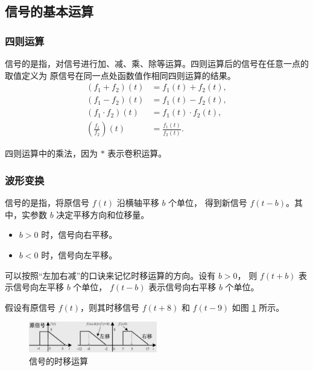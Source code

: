 \subsection{信号的基本运算}

\subsubsection{四则运算}

\begin{definition}
    信号的是指，对信号进行加、减、乘、除等运算。四则运算后的信号在任意一点的取值定义为
    原信号在同一点处函数值作相同四则运算的结果。
    \begin{align*}
        (f_1 + f_2)(t) & = f_1(t) + f_2(t), \\
        (f_1 - f_2)(t) & = f_1(t) - f_2(t), \\
        (f_1 \cdot f_2)(t) & = f_1(t) \cdot f_2(t), \\
        \left(\frac{f_1}{f_2}\right)(t) & = \frac{f_1(t)}{f_2(t)}.
    \end{align*}
\end{definition}

\begin{note}
    四则运算中的乘法，因为 $*$ 表示卷积运算。
\end{note}

\subsubsection{波形变换}

\begin{definition}[时移运算]
    信号的是指，将原信号 $f(t)$ 沿横轴平移 $b$ 个单位，
    得到新信号 $f(t - b)$。其中，实参数 $b$ 决定平移方向和位移量。
    \begin{itemize}
        \item $b > 0$ 时，信号向右平移。
        \item $b < 0$ 时，信号向左平移。
    \end{itemize}
\end{definition}

\begin{note}
    可以按照``左加右减''的口诀来记忆时移运算的方向。设有 $b > 0$，
    则 $f(t + b)$ 表示信号向左平移 $b$ 个单位，
    $f(t - b)$ 表示信号向右平移 $b$ 个单位。
\end{note}

\begin{example}
    假设有原信号 $f(t)$，则其时移信号 $f(t + 8)$ 和 $f(t - 9)$ 如图 \ref{fig:waveform-translation} 所示。
    \begin{figure}[H]
        \centering
        \includegraphics[width=0.5\textwidth]{chap1/img/waveform-translation.png}
        \caption{信号的时移运算}
        \label{fig:waveform-translation}
    \end{figure}
\end{example}

